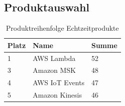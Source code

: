 \subsection{Produktauswahl}

\begin{table}[H]
\centering
\begin{tabular}{|l|l|l|}
\hline
Platz & Name & Summe \\ \hline
1 & AWS Lambda & \cellcolor[HTML]{DAE8FC}52 \\ \hline
3 & Amazon MSK & \cellcolor[HTML]{DAE8FC}48 \\ \hline
4 & AWS IoT Events & \cellcolor[HTML]{DAE8FC}47 \\ \hline
5 & Amazon Kinesis & \cellcolor[HTML]{DAE8FC}46 \\ \hline
\end{tabular}
\caption{Produktreihenfolge Echtzeitprodukte}
\label{tab:Reihenfolge-Echtzeit}
\end{table}